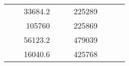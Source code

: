 \begin{table}[]
\begin{tabular}{|ccrccrccc}
\multicolumn{1}{|c|}{\cellcolor[HTML]{FFFFC7}}                                & \multicolumn{1}{c|}{\cellcolor[HTML]{DAE8FC}}                      & \multicolumn{1}{r|}{\cellcolor[HTML]{DAE8FC}33684.2}   & \multicolumn{1}{c|}{\cellcolor[HTML]{FFFFC7}}                                & \multicolumn{1}{c|}{\cellcolor[HTML]{DAE8FC}}                       & \multicolumn{1}{r|}{\cellcolor[HTML]{DDFDFF}225289}    &                                                                              &                                                                    &                                                        \\ \cline{3-3} \cline{6-6}
\multicolumn{1}{|c|}{\cellcolor[HTML]{FFFFC7}}                                & \multicolumn{1}{c|}{\cellcolor[HTML]{DAE8FC}}                      & \multicolumn{1}{r|}{\cellcolor[HTML]{DDFDFF}105760}    & \multicolumn{1}{c|}{\cellcolor[HTML]{FFFFC7}}                                & \multicolumn{1}{c|}{\cellcolor[HTML]{DAE8FC}}                       & \multicolumn{1}{r|}{\cellcolor[HTML]{DAE8FC}225869}    &                                                                              &                                                                    &                                                        \\ \cline{3-3} \cline{6-6}
\multicolumn{1}{|c|}{\cellcolor[HTML]{FFFFC7}}                                & \multicolumn{1}{c|}{\cellcolor[HTML]{DAE8FC}}                      & \multicolumn{1}{r|}{\cellcolor[HTML]{DAE8FC}56123.2}   & \multicolumn{1}{c|}{\cellcolor[HTML]{FFFFC7}}                                & \multicolumn{1}{c|}{\cellcolor[HTML]{DAE8FC}}                       & \multicolumn{1}{r|}{\cellcolor[HTML]{DDFDFF}479039}    &                                                                              &                                                                    &                                                        \\ \cline{3-3} \cline{6-6}
\multicolumn{1}{|c|}{\cellcolor[HTML]{FFFFC7}}                                & \multicolumn{1}{c|}{\cellcolor[HTML]{DAE8FC}}                      & \multicolumn{1}{r|}{\cellcolor[HTML]{DDFDFF}16040.6}   & \multicolumn{1}{c|}{\cellcolor[HTML]{FFFFC7}}                                & \multicolumn{1}{c|}{\cellcolor[HTML]{DAE8FC}}                       & \multicolumn{1}{r|}{\cellcolor[HTML]{DAE8FC}425768}    &                                                                              &                                                                    &                                                        \\ \cline{3-3} \cline{6-6}

\end{tabular}
\end{table}
